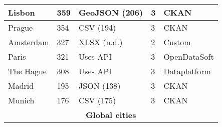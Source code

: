 \begin{table}[!ht]
\begin{tabular}{|lllll|}
    \multicolumn{1}{|l|}{Lisbon}                      & \multicolumn{1}{|l|}{359}                                              & \multicolumn{1}{|l|}{GeoJSON (206)}                                                   & \multicolumn{1}{|l|}{3}        & \multicolumn{1}{|l|}{CKAN}                                   \\ \hline
    \multicolumn{1}{|l|}{Prague}                      & \multicolumn{1}{|l|}{354}                                              & \multicolumn{1}{|l|}{CSV (194)}                                                       & \multicolumn{1}{|l|}{3}        & \multicolumn{1}{|l|}{CKAN}                                   \\ \hline
    \multicolumn{1}{|l|}{Amsterdam}                   & \multicolumn{1}{|l|}{327}                                              & \multicolumn{1}{|l|}{XLSX (n.d.)}                                                  & \multicolumn{1}{|l|}{2}        & \multicolumn{1}{|l|}{Custom}                                   \\ \hline
    \multicolumn{1}{|l|}{Paris}                       & \multicolumn{1}{|l|}{321}                                              & \multicolumn{1}{|l|}{Uses \acs{API}}                                                  & \multicolumn{1}{|l|}{3}        & \multicolumn{1}{|l|}{OpenDataSoft}                                   \\ \hline
    \multicolumn{1}{|l|}{The Hague}                   & \multicolumn{1}{|l|}{308}                                              & \multicolumn{1}{|l|}{Uses \acs{API}}                                                  & \multicolumn{1}{|l|}{3}        & \multicolumn{1}{|l|}{Dataplatform}                                   \\ \hline
    \multicolumn{1}{|l|}{Madrid}                      & \multicolumn{1}{|l|}{195}                                              & \multicolumn{1}{|l|}{JSON (138)}                                                      & \multicolumn{1}{|l|}{3}        & \multicolumn{1}{|l|}{CKAN}                                   \\ \hline
    \multicolumn{1}{|l|}{Munich}                      & \multicolumn{1}{|l|}{176}                                              & \multicolumn{1}{|l|}{CSV (175)}                                                       & \multicolumn{1}{|l|}{3}        & \multicolumn{1}{|l|}{CKAN}                                   \\ \hline
    \multicolumn{5}{|c|}{\textbf{Global cities}}      \\ \hline

\end{tabular}
\end{table}
